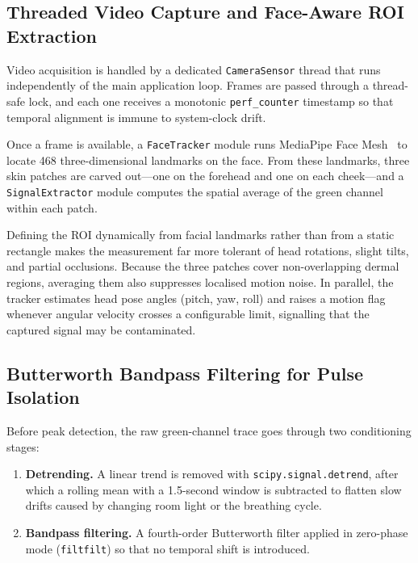 \documentclass[conference]{IEEEtran}
\begin{document}
\subsection{Threaded Video Capture and Face-Aware ROI Extraction}

Video acquisition is handled by a dedicated \texttt{CameraSensor}
thread that runs independently of the main application loop.
Frames are passed through a thread-safe lock, and each one
receives a monotonic \texttt{perf\_counter} timestamp so that
temporal alignment is immune to system-clock drift.

Once a frame is available, a \texttt{FaceTracker} module runs
MediaPipe Face Mesh~\cite{lugaresi2019mediapipe} to locate 468
three-dimensional landmarks on the face. From these landmarks,
three skin patches are carved out---one on the forehead and one
on each cheek---and a \texttt{SignalExtractor} module computes
the spatial average of the green channel within each patch.

Defining the ROI dynamically from facial landmarks rather than
from a static rectangle makes the measurement far more tolerant
of head rotations, slight tilts, and partial occlusions. Because
the three patches cover non-overlapping dermal regions, averaging
them also suppresses localised motion noise. In parallel, the
tracker estimates head pose angles (pitch, yaw, roll) and raises
a motion flag whenever angular velocity crosses a configurable
limit, signalling that the captured signal may be contaminated.

\subsection{Butterworth Bandpass Filtering for Pulse Isolation}

Before peak detection, the raw green-channel trace goes through
two conditioning stages:

\begin{enumerate}
  \item \textbf{Detrending.} A linear trend is removed with
        \texttt{scipy.signal.detrend}, after which a rolling mean
        with a 1.5-second window is subtracted to flatten slow
        drifts caused by changing room light or the breathing
        cycle.

  \item \textbf{Bandpass filtering.} A fourth-order Butterworth
        filter applied in zero-phase mode (\texttt{filtfilt}) so
        that no temporal shift is introduced.
\end{enumerate}
\end{document}
